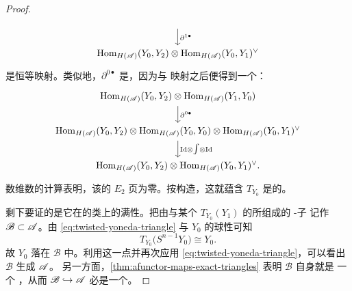 \begin{proof}
\begin{equation*}
\begin{tikzcd}
\ar[d,"\partial^{1\bullet}"]\\
\Hom_{H(\scr{A})}(Y_0,Y_2)\otimes\Hom_{H(\scr{A})}(Y_0,Y_1)^\vee
\end{tikzcd}
\end{equation*}
是恒等映射。类似地，$\partial^{0\bullet}$ 是\trInjective，因为与%
\trPoincare{}映射\trComposition{}之后便得到一个\trIsomorphism：
\begin{equation*}
\begin{tikzcd}
\Hom_{H(\scr{A})}(Y_0,Y_2)\otimes\Hom_{H(\scr{A})}(Y_1,Y_0)
\ar[d,"\partial^{0\bullet}"]\\
\Hom_{H(\scr{A})}(Y_0,Y_2)\otimes\Hom_{H(\scr{A})}(Y_0,Y_0)\otimes
\Hom_{H(\scr{A})}(Y_0,Y_1)^\vee
\ar[d,"\mathrm{Id}\otimes{\textstyle\int}\otimes\mathrm{Id}"]\\
\Hom_{H(\scr{A})}(Y_0,Y_2)\otimes\Hom_{H(\scr{A})}(Y_0,Y_1)^\vee.
\end{tikzcd}
\end{equation*}
数维数的计算表明，该\trSpectralSequence{}的 $E_2$ 页为零。按构造，这就蕴含
$T_{Y_0}$ 是\trCohomology\trFullyFaithful{}的。

剩下要证的是它在\trObject{}的\trIsomorphism{}类上的满性。把由与某个
$T_{Y_0}(Y_1)$ \trIsomorphic{}的\trObject{}所组成的\trFull{} \trAinfty-子%
\trCategory{}记作 $\mathscr{B}\subset\mathscr{A}$。由
\eqref{eq:twisted-yoneda-triangle} 与 $Y_0$ 的球性可知
\begin{equation*}
T_{Y_0}\bigl(S^{n-1}Y_0\bigr)\cong Y_0.
\end{equation*}
故 $Y_0$ 落在 $\mathscr{B}$ 中。利用这一点并再次应用
\eqref{eq:twisted-yoneda-triangle}，可以看出 $\mathscr{B}$ 生成 $\mathscr{A}$。
另一方面，\cref{thm:afunctor-maps-exact-triangles} 表明 $\mathscr{B}$ 自身就是
一个\trTriangulated{} \trACategory，从而\trInclusionMap{}%
$\mathscr{B}\hookrightarrow\mathscr{A}$ 必是一个\trQuasiequivalence。
\end{proof}

